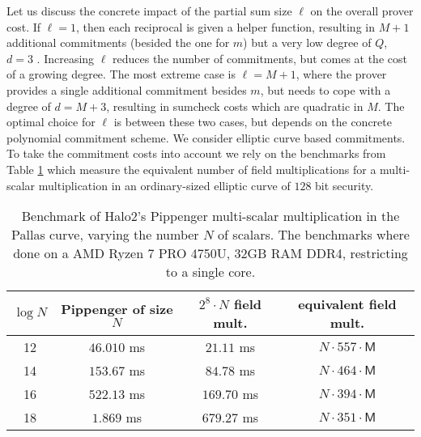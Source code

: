 \documentclass[11pt]{article}
\theoremstyle{definition}
\theoremstyle{definition}
\begin{document}
Let us discuss the concrete impact of the partial sum size $\ell$ on the overall prover cost. 
If $\ell = 1$, then each reciprocal is given a helper function, resulting in $M + 1$ additional commitments (besided the one for $m$) but a very low degree of $Q$, $d= 3$  .
Increasing $\ell$ reduces the number of commitments, but comes at the cost of a growing degree.
The most extreme case is $\ell = M+1$, where the prover provides a single additional commitment besides $m$, but needs to cope with a degree of $d= M + 3$, resulting in sumcheck costs which are quadratic in $M$.
The optimal choice for $\ell$ is between these two cases, but depends on the concrete polynomial commitment scheme.
We consider elliptic curve based commitments. 
To take the commitment costs into account we rely on the benchmarks from Table \ref{tab:pippenger} which measure the equivalent number of field multiplications for a multi-scalar multiplication in an ordinary-sized elliptic curve of $128$ bit security.


\begin{table}
\caption{%
Benchmark of Halo2's Pippenger multi-scalar multiplication in the Pallas curve, varying the number $N$ of scalars.
The benchmarks where done on a AMD Ryzen 7 PRO 4750U, 32GB RAM DDR4,  restricting to a single core.
}
\label{tab:pippenger}
\begin{center}
\begin{tabular}{|c|c|c|c|}
\hline
$\log N$ &  Pippenger of size $N$ & $2^8\cdot N$ field mult. & equivalent field mult.
\\\hline
12 & $46.010$ ms &  $21.11$ ms & $N\cdot 557\cdot \mathsf M$
\\
14 & $153.67$ ms & $84.78$ ms & $N\cdot 464 \cdot \mathsf M$
\\
16 & $522.13$ ms & $169.70$ ms & $N\cdot 394\cdot\mathsf M$
\\
18 &       $1.869$  ms  & $679.27$ ms & $N\cdot 351\cdot\mathsf M$
\\\hline
\end{tabular}
\end{center}
\end{table}
\end{document}
